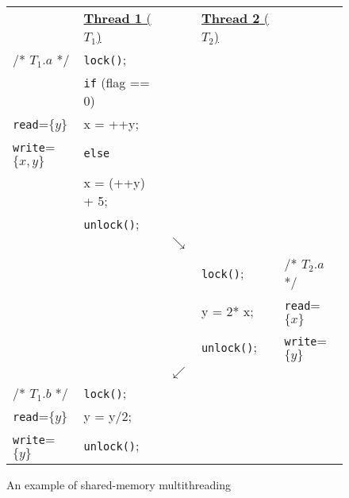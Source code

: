 \begin{figure}[t]
\centering
\myfontsize
{
\begin{tabular}
{m{1.5cm} m{2cm} m{0.1cm} m{1.8cm} m{1.2cm}}
&\underline{{\bf Thread 1} ($T_1$)} & & \underline{ {\bf Thread 2}  ($T_2$)} &\\ 
 

/* \underline{$T_{1}.a$} */ & {\tt lock()}; && &\\
& {\tt if} (flag == 0) && &\\
{\tt read}=$\{y\}$  & \hspace{3mm} x = ++y;&& &\\
{\tt write}=$\{x, y\}$  & {\tt else} && &\\
&\hspace{3mm}   x = (++y) + 5;&& &\\
  & {\tt unlock()};&& &\\
        &  &  $\searrow$ & & \\
   

&&  & {\tt lock()}; &  /* \underline{$T_{2}.a$ }*/\\
&&  & y = 2* x;    & {\tt read}=$\{x\}$  \\
&  &  & {\tt unlock()}; &  {\tt write}=$\{y\}$ \\  

 &  &  $\swarrow$ & & \\

/* \underline{$T_{1}.b$} */ & {\tt lock()}; && &\\


{\tt read}=$\{y\}$  & y = y/2;&& &\\
{\tt write}=$\{ y\}$  & {\tt unlock()};  && &\\


  
  
\end{tabular}
}


\caption{ An example of shared-memory multithreading}
\label{fig:simple-example}
\end{figure}
